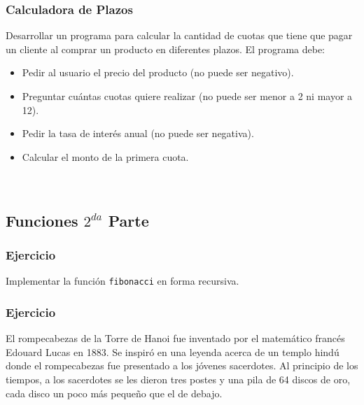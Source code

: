 \subsubsection{Calculadora de Plazos}
Desarrollar un programa para calcular la cantidad de cuotas que tiene que pagar un cliente al comprar un producto en diferentes plazos. El programa debe:
\begin{itemize}
  \item Pedir al usuario el precio del producto (no puede ser negativo).
  \item Preguntar cuántas cuotas quiere realizar (no puede ser menor a 2 ni mayor a 12).
  \item Pedir la tasa de interés anual (no puede ser negativa).
  \item Calcular el monto de la primera cuota.
\end{itemize}

\begin{lstlisting}[style=customc, basicstyle=\ttfamily]
\end{lstlisting}

\subsubsection{}
\begin{lstlisting}[style=customc, basicstyle=\ttfamily]
\end{lstlisting}

\subsection*{Funciones $2^{da}$ Parte}

\subsubsection{Ejercicio}
Implementar la función \texttt{fibonacci} en forma recursiva.

\lstset{inputencoding=utf8/latin1}


\subsubsection{Ejercicio}
El rompecabezas de la Torre de Hanoi fue inventado por el matemático francés Edouard Lucas en 1883. Se inspiró en una leyenda acerca de un templo hindú donde el rompecabezas fue presentado a los jóvenes sacerdotes. Al principio de los tiempos, a los sacerdotes se les dieron tres postes y una pila de 64 discos de oro, cada disco un poco más pequeño que el de debajo. 

